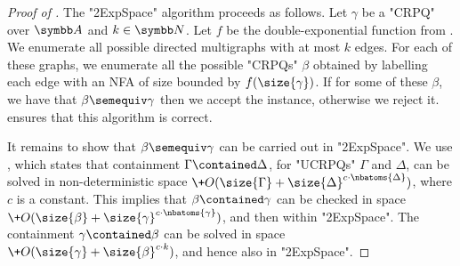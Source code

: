 \begin{proof}[Proof of ]
	The "2ExpSpace" algorithm proceeds as follows. Let $\gamma$ be a "CRPQ"  over $\A$ and $k\in\N$. Let $f$ be the double-exponential function from . We enumerate all possible directed multigraphs with at most $k$ edges. For each of these graphs, we enumerate all the possible "CRPQs" $\beta$ obtained by labelling each edge with an NFA of size bounded by $f(\size{\gamma})$. If for some of these $\beta$, we have that $\beta\semequiv \gamma$ then we accept the instance, otherwise we reject it.  ensures that this algorithm is correct.

	It remains to show that  $\beta\semequiv \gamma$ can be carried out in "2ExpSpace". We use , which states that containment $\Gamma\contained \Delta$, for "UCRPQs" $\Gamma$ and  $\Delta$, can be solved in non-deterministic space $\+O(\size{\Gamma} + \size{\Delta}^{c\cdot \nbatoms{\Delta}})$, where $c$ is a constant. This implies that $\beta\contained \gamma$ can be checked in space $\+O(\size{\beta} + \size{\gamma}^{c\cdot \nbatoms{\gamma}})$, and then within "2ExpSpace". The containment $\gamma\contained \beta$ can be solved in space $\+O(\size{\gamma} + \size{\beta}^{c\cdot k})$, and hence also in "2ExpSpace".
\end{proof}



